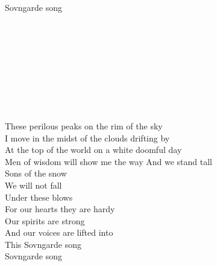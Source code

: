 \begin{flushleft}
\hspace{1.8cm}Sovngarde song \tab{}\\
\tab{}\tab{}\\
\tab{}\tab{}\\
\tab{}\tab{}\\
\tab{}\tab{}\\
\tab{}\tab{}\\
\tab{}\tab{}\\
\tab{}\tab{}\\
\tab{}\tab{}\\
\tab{}\tab{}\\
These perilous peaks on the rim of the sky \\
I move in the midst of the clouds drifting by\\
At the top of the world on a white doomful day\\ 
Men of wisdom will show me the way
\hops
\hspace{1.8cm}And we stand tall\\
\hspace{1.8cm}Sons of the snow\\
\hspace{1.8cm}We will not fall\\
\hspace{1.8cm}Under these blows\\
\hspace{1.8cm}For our hearts they are hardy\\
\hspace{1.8cm}Our spirits are strong\\
\hspace{1.8cm}And our voices are lifted into\\
\hspace{1.8cm}This Sovngarde song \\
\hspace{1.8cm}Sovngarde song \tab{}\\
\tab{}\tab{} \\
\tab{}\tab{}
\end{flushleft}
\newpage